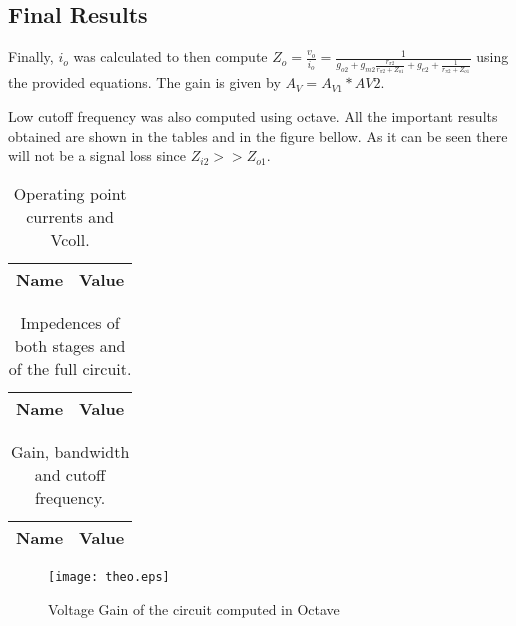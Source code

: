 \subsection{Final Results}


Finally, $i_o$ was calculated to then compute $Z_o=\frac{v_{o}}{i_o}=\frac{1}{g_{o2}+g_{m2}\frac{r_{\pi 2}}{r_{\pi 2}+Z_{o1}}+g_{e2}+\frac{1}{r_{\pi 2}+Z_{o1}}}$ using the provided equations. The gain is given by $A_V = A_{V1}*{AV2}$.

Low cutoff frequency was also computed using octave.
All the important results obtained are shown in the tables and in the figure bellow. As it can be seen there will not be a signal loss since $Z_{i2}>>Z_{o1}$.


\begin{table}[h!]
  \centering
  \begin{tabular}{|l|r|}
    \hline    
    {\bf Name} & {\bf Value} \\ \hline
  \end{tabular}
  \caption{Operating point currents and Vcoll.}
  \label{tab:1}
\end{table}


\begin{table}[h!]
  \centering
  \begin{tabular}{|l|r|}
    \hline    
    {\bf Name} & {\bf Value} \\ \hline
  \end{tabular}
  \caption{Impedences of both stages and of the full circuit.}
  \label{tab:2}
\end{table}

\vspace{3cm}

\begin{table}[h!]
  \centering
  \begin{tabular}{|l|r|}
    \hline    
    {\bf Name} & {\bf Value} \\ \hline
  \end{tabular}
  \caption{Gain, bandwidth and cutoff frequency.}
  \label{tab:3}
\end{table}

\vspace{1cm}

\begin{figure}[h] \centering
\texttt{[image: theo.eps]}
\caption{Voltage Gain of the circuit computed in Octave}
\label{sh}
\end{figure}












